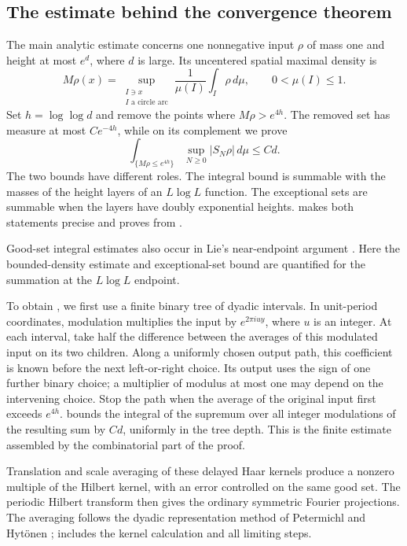 \subsection{The estimate behind the convergence theorem}

The main analytic estimate concerns one nonnegative input $\rho$ of mass
one and height at most $e^d$, where $d$ is large. Its uncentered spatial
maximal density is
\[
 M\rho(x)=\sup_{\substack{I\ni x\\I\text{ a circle arc}}}
            \frac{1}{\mu(I)}\int_I\rho\,d\mu,
 \qquad 0<\mu(I)\le1.
\]
Set $h=\log\log d$ and remove the points where $M\rho>e^{4h}$. The removed set has measure at most
$Ce^{-4h}$, while on its complement we prove
\begin{equation}\label{eq:intro-good-set}
 \int_{\{M\rho\le e^{4h}\}}\sup_{N\ge0}|S_N\rho|\,d\mu
 \le Cd.
\end{equation}
The two bounds have different roles. The integral bound is summable with
the masses of the height layers of an $L\log L$ function. The exceptional
sets are summable when the layers have doubly exponential heights.
 makes both statements precise and proves
 from .

Good-set integral estimates also occur in Lie's near-endpoint argument
\cite[Proposition~3.1 and (3.13)]{Lie2013}. Here the bounded-density estimate
and exceptional-set bound are quantified for the summation at the
$L\log L$ endpoint.

To obtain , we first use a finite binary tree of
dyadic intervals. In unit-period coordinates, modulation multiplies the
input by $e^{2\pi iuy}$, where $u$ is an integer. At each interval, take
half the difference between the averages of this modulated input on its
two children. Along a uniformly chosen output path, this coefficient is
known before the next left-or-right choice. Its output uses the sign of
one further binary choice; a multiplier of modulus at most one may depend on the
intervening choice. Stop the path when the average of the original
input first exceeds $e^{4h}$.  bounds the integral of
the supremum over all integer modulations of the resulting sum by $Cd$, uniformly
in the tree depth. This is the finite estimate assembled by the
combinatorial part of the proof.

Translation and scale averaging of these delayed Haar kernels produce a
nonzero multiple of the Hilbert kernel, with an error controlled on the
same good set. The periodic Hilbert transform then gives the ordinary
symmetric Fourier projections. The averaging follows the dyadic
representation method of Petermichl and Hyt\"onen
\cite{Petermichl2000,Hytonen2008};
 includes the kernel calculation and all limiting steps.

